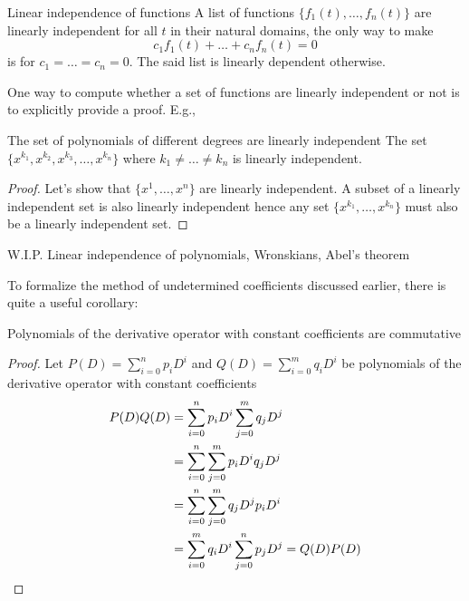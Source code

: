 \begin{df}{Linear independence of functions}{}
  A list of functions \(\{f_1(t), \dots, f_n(t)\}\) are linearly independent \ifft for
  all \(t\) in their natural domains, the only way to make
  \begin{equation}
    c_1 f_1(t) + \dots + c_n f_n(t) = 0
  \end{equation}
  is for \(c_1 = \dots = c_n = 0\). The said list is linearly dependent otherwise.
\end{df}

One way to compute whether a set of functions are linearly independent or not is to
explicitly provide a proof. E.g.,

\begin{prop}{The set of polynomials of different degrees are linearly independent}
  The set \(\{x^{k_1}, x^{k_2}, x^{k_3}, \dots, x^{k_n}\}\) where \(k_1 \neq \dots \neq k_n\)
  is linearly independent.
\end{prop}

\begin{proof}
  Let's show that \(\{x^1, \dots, x^n\}\) are linearly independent. A subset of a linearly
  independent set is also linearly independent hence any set \(\{x^{k_1}, \dots, x^{k_n}\}\)
  must also be a linearly independent set.
\end{proof}

{\color{red} W.I.P. Linear independence of polynomials, Wronskians, Abel's theorem}

To formalize the method of undetermined coefficients discussed earlier, there is quite
a useful corollary:
\begin{cor}{}{}
  Polynomials of the derivative operator with constant coefficients are commutative
\end{cor}
\begin{proof}
  Let \(P(D) = \sum_{i=0}^n p_i D^i\) and \(Q(D) = \sum_{i=0}^m q_i D^i\) be polynomials
  of the derivative operator with constant coefficients
  \begin{align}
    P(D)Q(D) & = \sum_{i=0}^n p_i D^i \sum_{j=0}^m q_j D^j                     \\
             & = \sum_{i=0}^n \sum_{j=0}^m p_i D^i q_j D^j                     \\
             & = \sum_{i=0}^n \sum_{j=0}^m q_j D^j p_i D^i                     \\
             & = \sum_{i=0}^m q_i D^i \sum_{j=0}^n p_j D^j = Q(D)P(D) \qedhere
  \end{align}
\end{proof}

